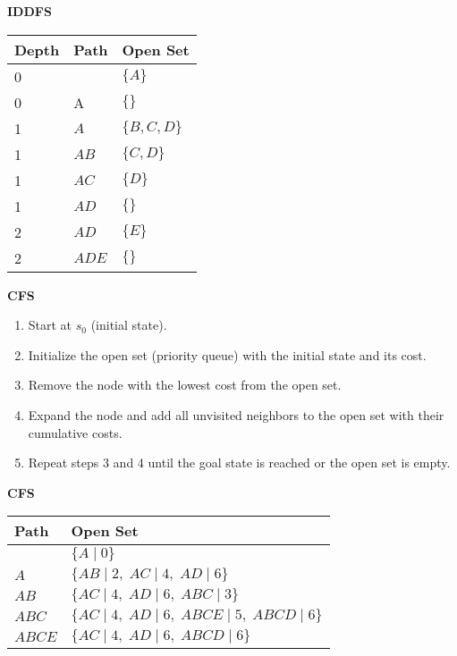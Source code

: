 \begin{example} \textbf{IDDFS}
    \begin{center}
        \begin{tabular}{lll}
        \toprule
        \textbf{Depth} & \textbf{Path} & \textbf{Open Set} \\
        \midrule
        0 & & $\{A\}$ \\
        0 & A & $\{\}$ \\
        \midrule
        1 & $A$ & $\{B, C, D\}$ \\
        1 & $AB$ & $\{C, D\}$ \\
        1 & $AC$ & $\{D\}$ \\
        1 & $AD$ & $\{\}$ \\
        \midrule
        2 & $AD$ & $\{E\}$ \\
        2 & $ADE$ & $\{\}$ \\
        \bottomrule
        \end{tabular}
    \end{center}
\end{example}

\begin{process} \textbf{CFS}
    \begin{enumerate}
        \item Start at $s_0$ (initial state).
        \item Initialize the open set (priority queue) with the initial state and its cost.
        \item Remove the node with the lowest cost from the open set.
        \item Expand the node and add all unvisited neighbors to the open set with their cumulative costs.
        \item Repeat steps 3 and 4 until the goal state is reached or the open set is empty.
    \end{enumerate}
\end{process}

\begin{example} \textbf{CFS}
    \begin{center}
        \begin{tabular}{ll}
        \toprule
        \textbf{Path} & \textbf{Open Set} \\
        \midrule
         & $\{A \mid 0\}$ \\
        $A$ & $\{AB \mid 2, \; AC \mid 4, \; AD \mid 6\}$ \\
        $AB$ & $\{AC \mid 4, \; AD \mid 6, \; ABC \mid 3\}$ \\
        $ABC$ & $\{AC \mid 4, \; AD \mid 6, \; ABCE \mid 5, \; ABCD \mid 6\}$ \\
        $ABCE$ & $\{AC \mid 4, \; AD \mid 6, \; ABCD \mid 6\}$ \\
        \bottomrule
        \end{tabular}
    \end{center}
\end{example}

